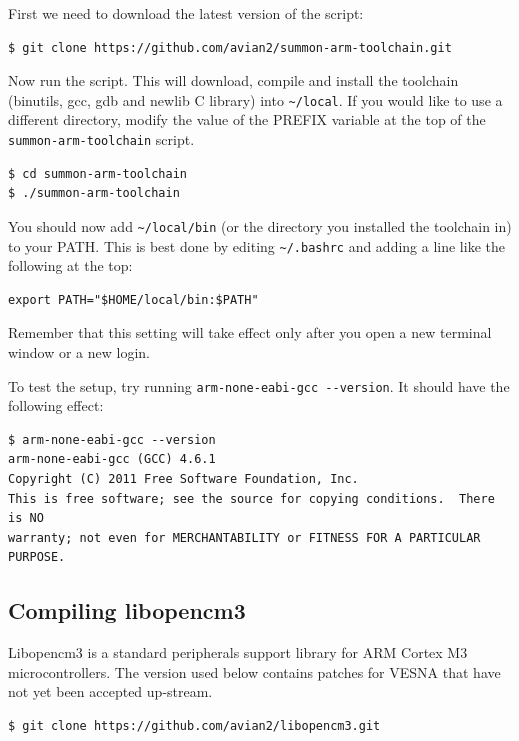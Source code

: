 \documentclass[a4paper, 10pt]{article}
\begin{document}
First we need to download the latest version of the script:

\begin{verbatim}
$ git clone https://github.com/avian2/summon-arm-toolchain.git
\end{verbatim}

Now run the script. This will download, compile and install the toolchain
(binutils, gcc, gdb and newlib C library) into \verb|~/local|. If you
would like to use a different directory, modify the value of the PREFIX variable
at the top of the \verb|summon-arm-toolchain| script.

\begin{verbatim}
$ cd summon-arm-toolchain
$ ./summon-arm-toolchain
\end{verbatim}

You should now add \verb|~/local/bin| (or the directory you installed the toolchain
in) to your PATH. This is best done by editing \verb|~/.bashrc| and adding a
line like the following at the top:

\begin{verbatim}
export PATH="$HOME/local/bin:$PATH"
\end{verbatim}

Remember that this setting will take effect only after you open a new terminal window or
a new login.

To test the setup, try running \verb|arm-none-eabi-gcc --version|. It should have the
following effect:

\begin{verbatim}
$ arm-none-eabi-gcc --version
arm-none-eabi-gcc (GCC) 4.6.1
Copyright (C) 2011 Free Software Foundation, Inc.
This is free software; see the source for copying conditions.  There is NO
warranty; not even for MERCHANTABILITY or FITNESS FOR A PARTICULAR PURPOSE.
\end{verbatim}

\subsection{Compiling libopencm3}

Libopencm3 is a standard peripherals support library for ARM Cortex M3
microcontrollers. The version used below contains patches for VESNA that have
not yet been accepted up-stream.

\begin{verbatim}
$ git clone https://github.com/avian2/libopencm3.git
\end{verbatim}
\end{document}
